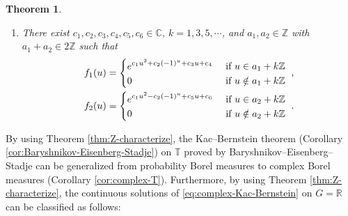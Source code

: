 \documentclass[12pt]{article}
\newtheorem{theorem}{Theorem}[section]
\theoremstyle{definition}
\theoremstyle{remark}
\numberwithin{equation}{section}
\numberwithin{figure}{section}
\numberwithin{table}{section}
\begin{document}
\begin{theorem}
\begin{enumerate}
\item \label{item:Z-characterize-Gauss}

There exist $c_1 , c_2 , c_3 , c_4 , c_5 , c_6 \in \mathbb{ C } $, $ k = 1 , 3 , 5 , \cdots $, and $ a_1 , a_2 \in \mathbb{ Z } $ with $ a_1 + a_2 \in 2 \mathbb{ Z } $ such that
\begin{align}
  f_1 ( u )
  & =
  \left\{
  \begin{aligned}
    & e^{ c_1 u^2 + c_2 ( - 1 )^u + c_3 u + c_4 } & & \text{ if $ u \in a_1 + k \mathbb{ Z } $} \\
    & 0 & & \text{ if $ u \notin a_1 + k \mathbb{ Z } $ }
  \end{aligned}
  \right. , \\
  f_2 ( u )
  & =
  \left\{
  \begin{aligned}
    & e^{ c_1 u^2 - c_2 ( - 1 )^u + c_5 u + c_6 } & & \text{ if $ u \in a_2 + k \mathbb{ Z } $} \\
    & 0 & & \text{ if $ u \notin a_2 + k \mathbb{ Z } $ }
  \end{aligned}
  \right. .
\end{align}

\end{enumerate}

\end{theorem}

By using Theorem \ref{thm:Z-characterize}, the Kac--Bernstein theorem (Corollary \ref{cor:Baryshnikov-Eisenberg-Stadje}) on $ \mathbb{ T } $ proved by Baryshnikov--Eisenberg--Stadje can be generalized from probability Borel measures to complex Borel measures (Corollary \ref{cor:complex-T}).
Furthermore, by using Theorem \ref{thm:Z-characterize}, the continuous solutions of \eqref{eq:complex-Kac-Bernstein} on $ G = \mathbb{ R } $ can be classified as follows:
\end{document}
